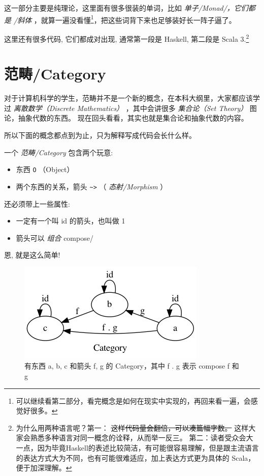 \documentclass[letterspacing]{tufte-book}
\begin{document}
这一部分主要是纯理论，这里面有很多很装的单词，比如 \emph{单子/Monad/，它们都是 /斜体}
，就算一遍没看懂\footnote{可以继续看第二部分，看完概念是如何在现实中实现的，再回来看一遍，会感觉好很多。}，把这些词背下来也足够装好长一阵子逼了。

这里还有很多代码, 它们都成对出现, 通常第一段是 Haskell, 第二段是 Scala 3.\footnote{为什么用两种语言呢？第一： \sout{这样代码量会翻倍，可以凑篇幅字数。} 这样大家会熟悉多种语言对同一概念的诠释，从而举一反三。
第二：读者受众会大一点，因为毕竟Haskell的表述比较简洁，有可能很容易理解，但是跟主流语言的表达方式大为不同，也有可能很难适应，加上表达方式更为具体的 Scala，便于加深理解。}

\chapter{范畴/Category}
\label{sec:orge141111}

对于计算机科学的学生，范畴并不是一个新的概念，在本科大纲里，大家都应该学过 \emph{离散数学（Discrete Mathematics）} ，其中会讲很多 \emph{集合论（Set Theory）} 图论，抽象代数的东西。
现在回头看看，其实也就是集合论和抽象代数的内容。

所以下面的概念都点到为止，只为解释写成代码会长什么样。

一个 \emph{范畴/Category} 包含两个玩意:
\begin{itemize}
\item 东西 \texttt{O} （Object）
\item 两个东西的关系，箭头 \texttt{\textasciitilde{}>} （ \emph{态射/Morphism} ）
\end{itemize}

还必须带上一些属性:
\begin{itemize}
\item 一定有一个叫 id 的箭头，也叫做 1
\item 箭头可以 \emph{组合} compose/
\end{itemize}

恩, 就是这么简单!

\begin{figure}[htbp]
\centering
\includegraphics[width=.9\linewidth]{images/category.png}
\caption{有东西 a, b, c 和箭头 f, g 的 Category，其中 f . g 表示 compose f 和 g}
\end{figure}
\end{document}
